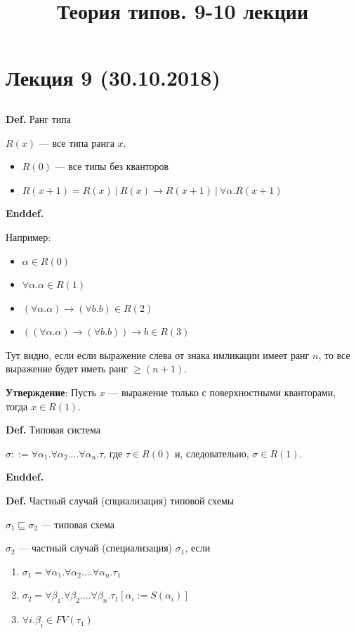 \documentclass[12pt]{article}
\title{Теория типов. 9-10 лекции}
\begin{document}
\section{Лекция 9 (30.10.2018)}

\subsection{}

\noindent\textbf{Def.} Ранг типа

$R(x)$ --- все типа ранга $x$.
\begin{itemize}
    \item $R(0)$ --- все типы без кванторов
    \item $R(x + 1) = R(x)\ |\ R(x) \rightarrow R(x + 1)\ |\ \forall \alpha.R(x + 1)$
\end{itemize}
\noindent\textbf{Enddef.} 

Например:
\begin{paracol}{2}
\begin{itemize}
    \item $\alpha \in R(0)$
    \item $\forall \alpha.\alpha \in R(1)$
    \item $(\forall \alpha.\alpha) \rightarrow (\forall b.b) \in R(2)$ 
    \item $((\forall \alpha.\alpha) \rightarrow (\forall b.b)) \rightarrow b \in R(3)$
\end{itemize}
\switchcolumn
Тут видно, если если выражение слева от знака имликации имеет ранг $n$, то все выражение будет иметь ранг $\geq (n + 1)$.
\end{paracol}

\textbf{Утверждение}: Пусть $x$ --- выражение только с поверхностными кванторами, тогда $x \in R(1)$. 

\noindent\textbf{Def.} Типовая система

$\sigma ::= \forall \alpha_1. \forall \alpha_2. \dots \forall \alpha_n. \tau$, где $\tau \in R(0)$ и, следовательно, $\sigma \in R(1)$.

\noindent\textbf{Enddef.} 

\noindent\textbf{Def.} Частный случай (спциализация) типовой схемы

$\sigma_1 \sqsubseteq \sigma_2$ --- типовая схема

$\sigma_2$ --- частный случай (специализация) $\sigma_1$, если 

\begin{enumerate}
    \item $\sigma_1 =  \forall \alpha_1. \forall \alpha_2. \dots \forall \alpha_n. \tau_1$
    \item $\sigma_2 =  \forall \beta_1. \forall \beta_2. \dots \forall \beta_n. \tau_1[\alpha_i := S(\alpha_i)]$
    \item $\forall i. \beta_i \in FV(\tau_1)$
\end{enumerate}
\end{document}
